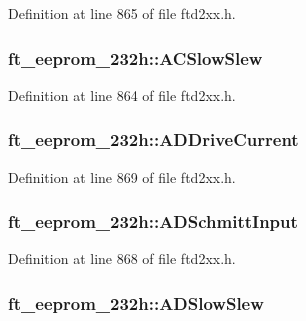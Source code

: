 Definition at line 865 of file ftd2xx.h.\hypertarget{structft__eeprom__232h_a3cfbbe62de0029839534fb469a9b50c9}{
\subsubsection[{ACSlowSlew}]{ {\bf ft\_\-eeprom\_\-232h::ACSlowSlew}}}
\label{structft__eeprom__232h_a3cfbbe62de0029839534fb469a9b50c9}


Definition at line 864 of file ftd2xx.h.\hypertarget{structft__eeprom__232h_a6aa2aea692700ed5e98a958819db3944}{
\subsubsection[{ADDriveCurrent}]{ {\bf ft\_\-eeprom\_\-232h::ADDriveCurrent}}}
\label{structft__eeprom__232h_a6aa2aea692700ed5e98a958819db3944}


Definition at line 869 of file ftd2xx.h.\hypertarget{structft__eeprom__232h_a9d6cc1ae3e56bad64ba55a3db9cd845c}{
\subsubsection[{ADSchmittInput}]{ {\bf ft\_\-eeprom\_\-232h::ADSchmittInput}}}
\label{structft__eeprom__232h_a9d6cc1ae3e56bad64ba55a3db9cd845c}


Definition at line 868 of file ftd2xx.h.\hypertarget{structft__eeprom__232h_a192cf979058aac20dbea8840a35f1bae}{
\subsubsection[{ADSlowSlew}]{ {\bf ft\_\-eeprom\_\-232h::ADSlowSlew}}}
\label{structft__eeprom__232h_a192cf979058aac20dbea8840a35f1bae}


